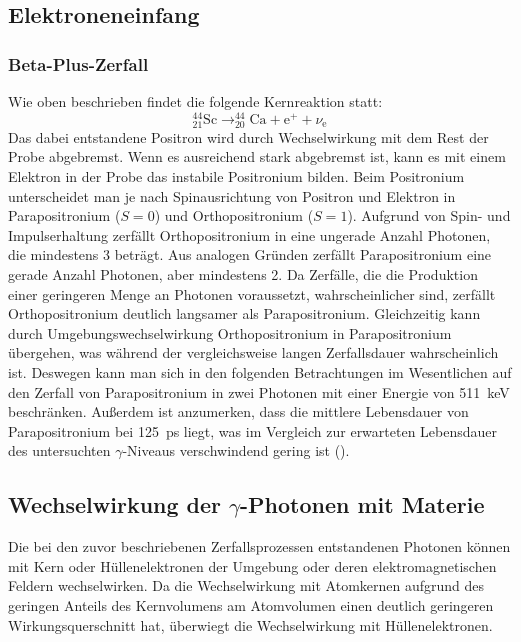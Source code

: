 \documentclass[
	a4paper,
	12pt,
	pagesize,
	ngerman
]{scrartcl}
\begin{document}
	\subsection{Elektroneneinfang}
	\subsubsection{Beta-Plus-Zerfall}
	Wie oben beschrieben findet die folgende Kernreaktion statt:
	\begin{equation}
		\label{eq_beta-plus}
		 _{21}^{44}\text{Sc} \rightarrow _{20}^{44}\text{Ca} + \text{e}^+ + \nu_{\text{e}}
	\end{equation}
	Das dabei entstandene Positron wird durch Wechselwirkung mit dem Rest der Probe abgebremst. %
	Wenn es ausreichend stark abgebremst ist, kann es mit einem Elektron in der Probe das instabile Positronium bilden.
	Beim Positronium unterscheidet man je nach Spinausrichtung von Positron und Elektron in Parapositronium ($S=0$) und Orthopositronium ($S=1$).
	Aufgrund von Spin- und Impulserhaltung zerfällt Orthopositronium in eine ungerade Anzahl Photonen, die mindestens \num{3} beträgt.
	Aus analogen Gründen zerfällt Parapositronium eine gerade Anzahl Photonen, aber mindestens \num{2}.
	Da Zerfälle, die die Produktion einer geringeren Menge an Photonen voraussetzt, wahrscheinlicher sind, zerfällt Orthopositronium deutlich langsamer als Parapositronium.
	Gleichzeitig kann durch Umgebungswechselwirkung Orthopositronium in Parapositronium übergehen, was während der vergleichsweise langen Zerfallsdauer wahrscheinlich ist. %
	Deswegen kann man sich in den folgenden Betrachtungen im Wesentlichen auf den Zerfall von Parapositronium in zwei Photonen mit einer Energie von \SI{511}{keV} beschränken.
	Außerdem ist anzumerken, dass die mittlere Lebensdauer von Parapositronium bei \SI{125}{ps} liegt, was im Vergleich zur erwarteten Lebensdauer des untersuchten $\gamma$-Niveaus verschwindend gering ist (\cite{Anleitung}).

	\subsection{Wechselwirkung der $\gamma$-Photonen mit Materie}

	Die bei den zuvor beschriebenen Zerfallsprozessen entstandenen Photonen können mit Kern oder Hüllenelektronen der Umgebung oder deren elektromagnetischen Feldern wechselwirken.
	Da die Wechselwirkung mit Atomkernen aufgrund des geringen Anteils des Kernvolumens am Atomvolumen einen deutlich geringeren Wirkungsquerschnitt hat, überwiegt die Wechselwirkung mit Hüllenelektronen. %
\end{document}
